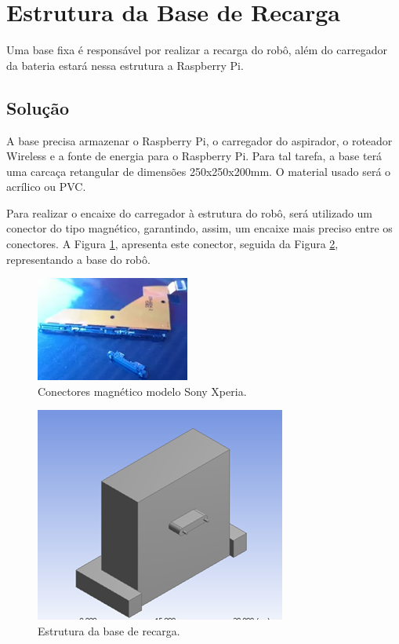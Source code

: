 \section{Estrutura da Base de Recarga} %
\label{sec:estrutura_da_base}
	
	Uma base fixa é responsável por realizar a recarga do robô, além do carregador da bateria estará nessa estrutura a Raspberry Pi.

	\subsection{Solução} %
	\label{sub:solução}
		
		A base precisa armazenar o Raspberry Pi, o carregador do aspirador, o roteador Wireless e a fonte de energia para o Raspberry Pi. Para tal tarefa, a base terá uma carcaça retangular de dimensões 250x250x200mm. O material usado será o acrílico ou PVC. 

		Para realizar o encaixe do carregador à estrutura do robô, será utilizado um conector do tipo magnético, garantindo, assim, um encaixe mais preciso entre os conectores. A Figura \ref{img:conectores}, apresenta este conector, seguida da Figura \ref{img:estrutura_base}, representando a base do robô.

		\begin{figure}[H]
			\centering
			\includegraphics[scale=0.8]{figuras/conector_mag.png}
			\caption{Conectores magnético modelo Sony Xperia.}
			\label{img:conectores}
		\end{figure}

		\begin{figure}[H]
			\centering
			\includegraphics[scale=0.8]{figuras/estrutura_base.png}
			\caption{Estrutura da base de recarga.}
			\label{img:estrutura_base}
		\end{figure}	
	

